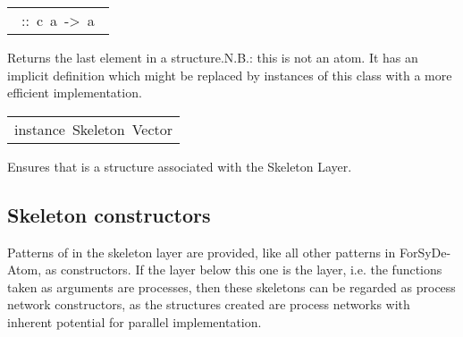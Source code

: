 \begin{haddockdesc}
\begin{haddockdesc}
\item[\begin{tabular}{@{}l}\haddockid{last}\ ::\ c\ a\ ->\ a\ \end{tabular}]
\haddockbegindoc
Returns the last element in a structure.N.B.: this is not an atom. It has an implicit definition which might be replaced by instances of this class with a more efficient implementation.\par

\end{haddockdesc}


\item[\begin{tabular}{@{}l}
instance\ Skeleton\ Vector
\end{tabular}]\haddockbegindoc
Ensures that  is a structure associated with the Skeleton Layer.\par

\end{haddockdesc}

\subsection{Skeleton constructors}
Patterns of in the skeleton layer are provided, like all other
 patterns in ForSyDe-Atom, as constructors. If the layer below
 this one is the  layer, i.e. the functions
 taken as arguments are processes, then these skeletons can be
 regarded as process network constructors, as the structures
 created are process networks with inherent potential for parallel
 implementation.\par

